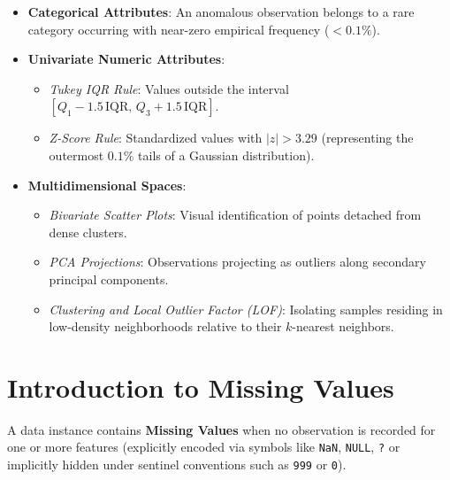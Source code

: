 \begin{itemize}
    \item \textbf{Categorical Attributes}: An anomalous observation belongs to a rare category occurring with near-zero empirical frequency ($< 0.1\%$).
    \item \textbf{Univariate Numeric Attributes}:
    \begin{itemize}[noitemsep]
        \item \textit{Tukey IQR Rule}: Values outside the interval $[Q_1 - 1.5\,\text{IQR},\, Q_3 + 1.5\,\text{IQR}]$.
        \item \textit{Z-Score Rule}: Standardized values with $|z| > 3.29$ (representing the outermost $0.1\%$ tails of a Gaussian distribution).
    \end{itemize}
    \item \textbf{Multidimensional Spaces}:
    \begin{itemize}[noitemsep]
        \item \textit{Bivariate Scatter Plots}: Visual identification of points detached from dense clusters.
        \item \textit{PCA Projections}: Observations projecting as outliers along secondary principal components.
        \item \textit{Clustering and Local Outlier Factor (LOF)}: Isolating samples residing in low-density neighborhoods relative to their $k$-nearest neighbors.
    \end{itemize}
\end{itemize}

\section{Introduction to Missing Values}
\label{sec:dm-missing-values-intro}

A data instance contains \textbf{Missing Values} when no observation is recorded for one or more features (explicitly encoded via symbols like \texttt{NaN}, \texttt{NULL}, \texttt{?} or implicitly hidden under sentinel conventions such as \texttt{999} or \texttt{0}).

